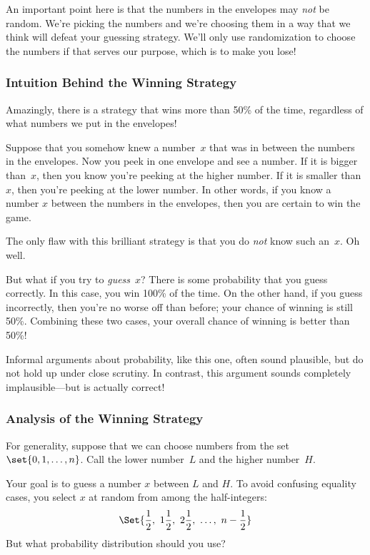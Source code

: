 An important point here is that the numbers in the envelopes may
\emph{not} be random.  We're picking the numbers and we're choosing
them in a way that we think will defeat your guessing strategy.  We'll
only use randomization to choose the numbers if that serves our
purpose, which is to make you lose!

\subsubsection{Intuition Behind the Winning Strategy}

Amazingly, there is a strategy that wins more than 50\% of the time,
regardless of what numbers we put in the envelopes!

Suppose that you somehow knew a number~$x$ that was in between the
numbers in the envelopes.  Now you peek in one envelope and see a
number.  If it is bigger than~$x$, then you know you're peeking at the
higher number.  If it is smaller than $x$, then you're peeking at the
lower number.  In other words, if you know a number $x$ between the
numbers in the envelopes, then you are certain to win the game.

The only flaw with this brilliant strategy is that you do \emph{not}
know such an~$x$.  Oh well.

But what if you try to \emph{guess}~$x$?  There is some probability
that you guess correctly.  In this case, you win 100\% of the time.
On the other hand, if you guess incorrectly, then you're no worse off
than before; your chance of winning is still 50\%.  Combining these
two cases, your overall chance of winning is better than 50\%!

Informal arguments about probability, like this one, often sound
plausible, but do not hold up under close scrutiny.  In contrast, this
argument sounds completely implausible---but is actually correct!

\subsubsection{Analysis of the Winning Strategy}

For generality, suppose that we can choose numbers from the set
$\set{0, 1, \dots, n}$.  Call the lower number~$L$ and the higher
number~$H$.

Your goal is to guess a number $x$ between $L$ and $H$.  To avoid
confusing equality cases, you select $x$ at random from among the
half-integers:
%
\[
\Set{\frac{1}{2},\ 1\frac{1}{2},\ 2\frac{1}{2},\ \dots,\ n - \frac{1}{2}}
\]
%
But what probability distribution should you use?

